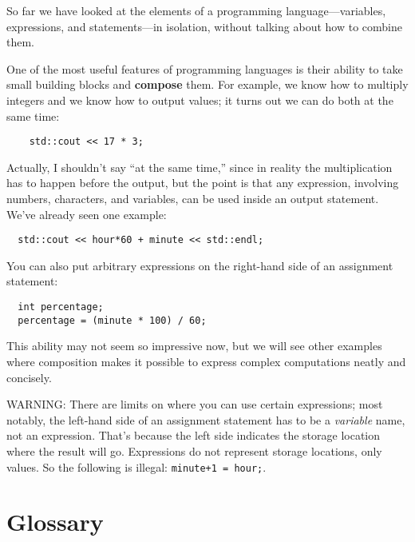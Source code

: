 So far we have looked at the elements of a programming
language---variables, expressions, and statements---in
isolation, without talking about how to combine them.

One of the most useful features of programming languages
is their ability to take small building blocks and
{\bf compose} them.  For example, we know how to multiply
integers and we know how to output values; it turns out we can
do both at the same time:

\begin{verbatim}
    std::cout << 17 * 3;
\end{verbatim}
%
Actually, I shouldn't say ``at the same time,'' since in reality
the multiplication has to happen before the output, but
the point is that any expression, involving numbers, characters,
and variables, can be used inside an output statement.  We've
already seen one example:

\begin{verbatim}
  std::cout << hour*60 + minute << std::endl;
\end{verbatim}
%
You can also put arbitrary expressions on the right-hand
side of an assignment statement:

\begin{verbatim}
  int percentage;
  percentage = (minute * 100) / 60;
\end{verbatim}
%
This ability may not seem so impressive now, but we will see
other examples where composition makes it possible
to express complex computations neatly and concisely.

WARNING: There are limits on where you can use certain
expressions; most notably, the left-hand side of an assignment
statement has to be a {\em variable} name, not an expression.
That's because the left side indicates the storage location
where the result will go.  Expressions
do not represent storage locations, only values.  So the
following is illegal:  {\tt minute+1 = hour;}.

\section{Glossary}

